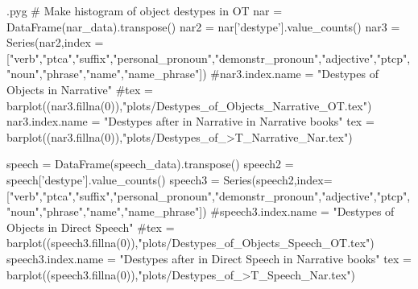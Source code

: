 \documentclass{report}
\makeatletter
\newenvironment{python}{%
  \VerbatimEnvironment
  \minted@resetoptions
  \setkeys{minted@opt}{}
      \begin{VerbatimOut}{\jobname.pyg}}
{%
      \end{VerbatimOut}
      \minted@pygmentize{python}
      \DeleteFile{\jobname.pyg}}
\makeatother
\begin{document}
\begin{python}
# Make histogram of object destypes in OT
nar = DataFrame(nar_data).transpose()
nar2 = nar['destype'].value_counts()
nar3 = Series(nar2,index = ["verb","ptca","suffix","personal_pronoun","demonstr_pronoun","adjective","ptcp","noun","phrase","name","name_phrase"])
#nar3.index.name = "Destypes of Objects in Narrative"
#tex = barplot((nar3.fillna(0)),"plots/Destypes_of_Objects_Narrative_OT.tex")
nar3.index.name = "Destypes after  in Narrative in Narrative books"
tex = barplot((nar3.fillna(0)),"plots/Destypes_of_>T_Narrative_Nar.tex")


speech = DataFrame(speech_data).transpose()
speech2 = speech['destype'].value_counts()
speech3 = Series(speech2,index=["verb","ptca","suffix","personal_pronoun","demonstr_pronoun","adjective","ptcp","noun","phrase","name","name_phrase"])
#speech3.index.name = "Destypes of Objects in Direct Speech"
#tex = barplot((speech3.fillna(0)),"plots/Destypes_of_Objects_Speech_OT.tex")
speech3.index.name = "Destypes after  in Direct Speech in Narrative books"
tex = barplot((speech3.fillna(0)),"plots/Destypes_of_>T_Speech_Nar.tex")
\end{python}
\end{document}
